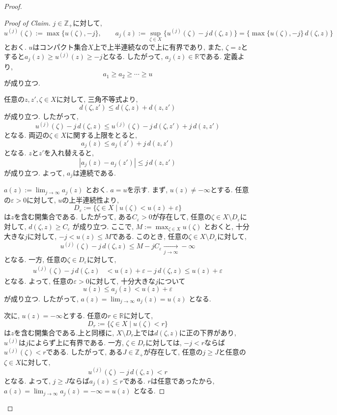 \documentclass[dvipdfmx,a4paper,11pt]{report} %
\theoremstyle{definition}
\theoremstyle{remark}
\numberwithin{equation}{section}
\newcommand{\R}{\mathbb{R}}
\newcommand{\N}{\mathbb{Z}_+}
\begin{document}
\begin{proof}
\begin{proof}[Proof of Claim]
$j \in \N$に対して,
\[
u^{(j)}(\zeta):=\max\{u(\zeta),-j\},
\qquad
a_j(z):=\sup_{\zeta \in X}
\bigl\{u^{(j)}(\zeta)-j\,d(\zeta,z)\bigr\}
=
\bigl\{\max\{u(\zeta),-j\}\,d(\zeta,z)\bigr\}
\]
とおく.
$u$はコンパクト集合$X$上で上半連続なので上に有界であり,
また, $\zeta=z$とすると$a_j(z)\geq u^{(j)}(z)\geq -j$となる.
したがって, $a_j(z) \in \R$である.
定義より,
\[
a_1 \geq a_2 \geq \cdots \geq u
\]
が成り立つ.

任意の$z,z',\zeta \in X$に対して,
三角不等式より,
\[
d(\zeta,z') \leq d(\zeta,z)+d(z,z')
\]
が成り立つ.
したがって,
\[
u^{(j)}(\zeta)-j\,d(\zeta,z)
\leq
u^{(j)}(\zeta)-j\,d(\zeta,z')+j\,d(z,z')
\]
となる.
両辺の$\zeta \in X$に関する上限をとると,
\[
a_j(z) \leq a_j(z')+j\,d(z,z')
\]
となる.
$z$と$z'$を入れ替えると,
\[
|a_j(z)-a_j(z')| \leq j\,d(z,z')
\]
が成り立つ.
よって, $a_j$は連続である.

\(
a(z):=\lim_{j \to \infty}a_j(z)
\)
とおく. $a=u$を示す.
まず, $u(z) \neq -\infty$とする.
任意の$\varepsilon > 0$に対して,
$u$の上半連続性より,
\[
D_\varepsilon
:=
\{\zeta \in X \mid u(\zeta)<u(z)+\varepsilon\}
\]
は$z$を含む開集合である.
したがって, ある$C_\varepsilon > 0$が存在して,
任意の$\zeta \in X \setminus D_\varepsilon$に対して,
\(
d(\zeta,z) \geq C_\varepsilon
\)
が成り立つ.
ここで,
\(
M:=\max_{\zeta \in X}u(\zeta)
\)
とおくと, 十分大きな$j$に対して, $-j<u(z)\leq M$である.
このとき, 任意の$\zeta \in X \setminus D_\varepsilon$に対して,
\[
u^{(j)}(\zeta)-j\,d(\zeta,z)
\leq
M-jC_\varepsilon
\xrightarrow[j \to \infty]{} -\infty
\]
となる.
一方, 任意の$\zeta \in D_\varepsilon$に対して,
\[
\begin{aligned}
u^{(j)}(\zeta)-j\,d(\zeta,z)
&<
u(z)+\varepsilon-j\,d(\zeta,z)
\leq u(z)+\varepsilon
\end{aligned}
\]
となる.
よって, 任意の$\varepsilon > 0$に対して,
十分大きな$j$について
\[
u(z) \leq a_j(z) < u(z)+\varepsilon
\]
が成り立つ.
したがって,
\(
a(z)=\lim_{j \to \infty}a_j(z)=u(z)
\)
となる.

次に, $u(z)=-\infty$とする.
任意の$r \in \R$に対して,
\[
D_r:=\{\zeta \in X \mid u(\zeta)<r\}
\]
は$z$を含む開集合である.上と同様に, $X \setminus D_r$上では$d(\zeta,z)$に正の下界があり,
$u^{(j)}$は$j$によらず上に有界である.
一方, $\zeta \in D_r$に対しては,
$-j<r$ならば$u^{(j)}(\zeta)<r$である.
したがって, ある$J \in \N$が存在して,
任意の$j \geq J$と任意の$\zeta \in X$に対して,
\[
u^{(j)}(\zeta)-j\,d(\zeta,z)<r
\]
となる.
よって, $j \geq J$ならば$a_j(z)\leq r$である.
$r$は任意であったから,
\(
a(z)=\lim_{j \to \infty}a_j(z)=-\infty=u(z)
\)
となる.
\end{proof}


\end{proof}
\end{document}

